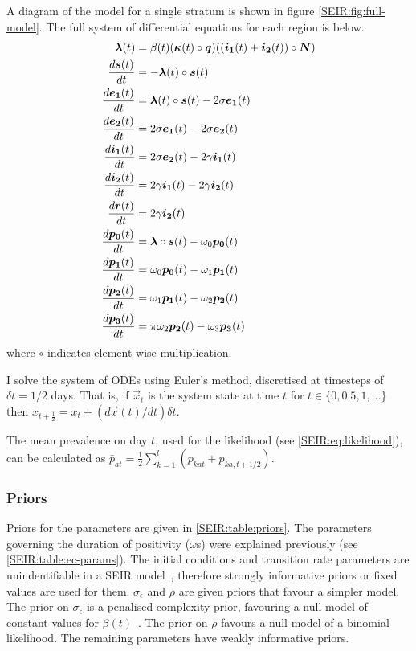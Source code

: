 \documentclass[thesis.tex]{subfiles}
\begin{document}
A diagram of the model for a single stratum is shown in figure \cref{SEIR:fig:full-model}.
The full system of differential equations for each region is below.
\begin{align}
    \label{SEIR:eq:fullODEs}
    \bm{\lambda}(t) &= \beta(t) (\bm{\kappa}(t) \circ \bm{q}) ((\bm{i_1}(t) + \bm{i_2}(t)) \circ \bm{N}) \\
    \frac{d\bm{s}(t)}{dt} &= -\bm{\lambda}(t) \circ \bm{s}(t) \\
    \frac{d\bm{e_1}(t)}{dt} &= \bm{\lambda}(t) \circ \bm{s}(t) - 2\sigma \bm{e_1}(t) \\
    \frac{d\bm{e_2}(t)}{dt} &= 2\sigma \bm{e_1}(t) - 2\sigma \bm{e_2}(t) \\
    \frac{d\bm{i_1}(t)}{dt} &= 2\sigma \bm{e_2}(t) - 2\gamma \bm{i_1}(t) \\
    \frac{d\bm{i_2}(t)}{dt} &= 2\gamma \bm{i_1}(t) - 2\gamma \bm{i_2}(t) \\
    \frac{d\bm{r}(t)}{dt} &= 2\gamma \bm{i_2}(t) \\
    \frac{d\bm{p_0}(t)}{dt} &= \bm{\lambda} \circ \bm{s}(t) - \omega_0 \bm{p_0}(t) \\
    \frac{d\bm{p_1}(t)}{dt} &= \omega_0 \bm{p_0}(t) - \omega_1 \bm{p_1}(t) \\
    \frac{d\bm{p_2}(t)}{dt} &= \omega_1 \bm{p_1}(t) - \omega_{2} \bm{p_2}(t) \\
    \frac{d\bm{p_3}(t)}{dt} &= \pi \omega_{2} \bm{p_2}(t) - \omega_{3} \bm{p_3}(t)
\end{align}
where $\circ$ indicates element-wise multiplication.

I solve the system of ODEs using Euler's method, discretised at timesteps of $\delta t = 1/2$ days.
That is, if $\vec{x}_t$ is the system state at time $t$ for $t \in \{ 0, 0.5, 1, \dots \}$ then $x_{t+\frac{1}{2}} = x_t + (d\vec{x}(t)/dt) \delta t$.

The mean prevalence on day $t$, used for the likelihood (see \cref{SEIR:eq:likelihood}), can be calculated as $\bar{p}_{at} = \frac{1}{2} \sum_{k=1}^l ( p_{kat} + p_{ka,t+1/2} )$.

\subsubsection{Priors} \label{SEIR:sec:priors}

Priors for the parameters are given in \cref{SEIR:table:priors}.
The parameters governing the duration of positivity ($\omega$s) were explained previously (see \cref{SEIR:table:ec-params}).
The initial conditions and transition rate parameters are unindentifiable in a SEIR model~\autocite{dankwaStructural}, therefore strongly informative priors or fixed values are used for them.
$\sigma_\epsilon$ and $\rho$ are given priors that favour a simpler model.
The prior on $\sigma_\epsilon$ is a penalised complexity prior, favouring a null model of constant values for $\beta(t)$~\autocite{simpsonPenalising}.
The prior on $\rho$ favours a null model of a binomial likelihood.
The remaining parameters have weakly informative priors.
\end{document}
